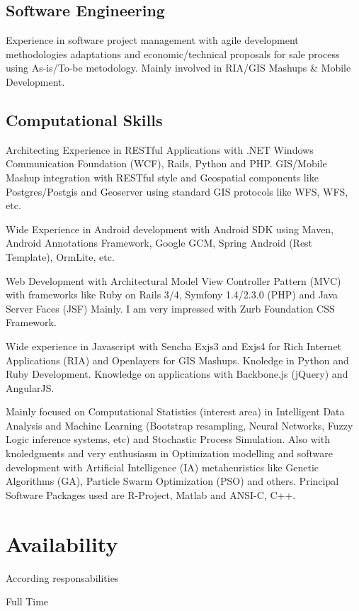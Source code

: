 \documentclass[11pt,letterpaper,roman]{moderncv}
\begin{document}
	\subsection{Software Engineering}
		{Experience in software project management with agile development
		methodologies adaptations and economic/technical proposals for sale process
		using As-is/To-be metodology. Mainly involved in RIA/GIS Mashups \& Mobile Development.}
		
	\subsection{Computational Skills}

		{Architecting Experience in RESTful Applications with .NET Windows
		Communication Foundation (WCF), Rails, Python and PHP. GIS/Mobile Mashup
		integration with RESTful style and Geospatial components like Postgres/Postgis
		and Geoserver using standard GIS protocols like WFS, WFS, etc.}

		{Wide Experience in Android development with Android
		SDK using Maven, Android Annotations Framework, Google GCM, Spring Android (Rest Template), OrmLite, etc.}

		{Web Development with Architectural Model View
		Controller Pattern (MVC) with frameworks like Ruby on Rails 3/4, Symfony 1.4/2.3.0 (PHP) and Java Server Faces (JSF) Mainly. I am very impressed with Zurb Foundation CSS Framework.}

		{Wide experience in Javascript with Sencha
		Exjs3 and Exjs4 for Rich Internet Applications (RIA) and Openlayers for GIS
		Mashups. Knoledge in Python and Ruby Development. Knowledge on applications with Backbone.js (jQuery) and AngularJS.}

		{Mainly focused on Computational Statistics (interest area) in
		Intelligent Data Analysis and Machine Learning (Bootstrap resampling, Neural
		Networks, Fuzzy Logic inference systems, etc)  and Stochastic Process
		Simulation. Also with knoledgments and very enthusiasm in Optimization modelling
		and software development with Artificial Intelligence (IA) metaheuristics like
		Genetic Algorithms (GA), Particle Swarm Optimization (PSO) and others. Principal
		Software Packages used are R-Project, Matlab and ANSI-C, C++.}

\section{Availability}
	{According responsabilities}

	{Full Time}
\end{document}
